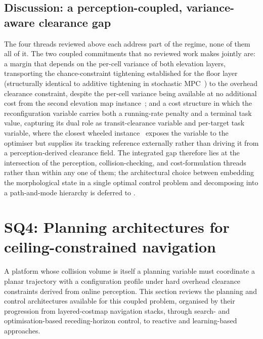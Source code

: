 \documentclass[11pt,a4paper]{article}
\begin{document}
\subsection{Discussion: a perception-coupled, variance-aware clearance gap}
\label{sec:sq3:discussion}

The four threads reviewed above each address part of the regime, none of them all of it. The two coupled commitments that no reviewed work makes jointly are: a margin that depends on the per-cell variance of both elevation layers, transporting the chance-constraint tightening established for the floor layer~\cite{fanSTEPStochasticTraversability2021,bipedal_cp_2025} (structurally identical to additive tightening in stochastic MPC~\cite{hewingLearningBasedModelPredictive2020,lorenzenConstraintTighteningStabilityStochastic2016}) to the overhead clearance constraint, despite the per-cell variance being available at no additional cost from the second elevation map instance~\cite{fankhauserProbabilisticTerrainMapping2018,mikiElevationMappingLocomotion2022}; and a cost structure in which the reconfiguration variable carries both a running-rate penalty and a terminal task value, capturing its dual role as transit-clearance variable and per-target task variable, where the closest wheeled instance~\cite{pankertDesignMotionPlanning2022} exposes the variable to the optimiser but supplies its tracking reference externally rather than driving it from a perception-derived clearance field. The integrated gap therefore lies at the intersection of the perception, collision-checking, and cost-formulation threads rather than within any one of them; the architectural choice between embedding the morphological state in a single optimal control problem and decomposing into a path-and-mode hierarchy is deferred to .

\section{SQ4: Planning architectures for ceiling-constrained navigation}
\label{sec:sq4}

A platform whose collision volume is itself a planning variable must coordinate a planar trajectory with a configuration profile under hard overhead clearance constraints derived from online perception. This section reviews the planning and control architectures available for this coupled problem, organised by their progression from layered-costmap navigation stacks, through search- and optimisation-based receding-horizon control, to reactive and learning-based approaches.
\end{document}
